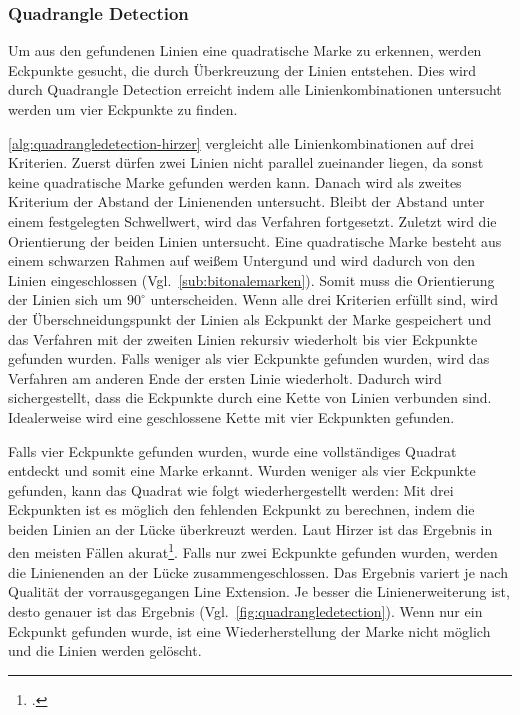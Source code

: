 \subsubsection{Quadrangle Detection} %
\label{sub:quadrangle_detection}

Um aus den gefundenen Linien eine quadratische Marke zu erkennen, werden Eckpunkte gesucht, die durch Überkreuzung der
 Linien entstehen. Dies wird durch Quadrangle Detection erreicht indem alle Linienkombinationen untersucht werden um
 vier Eckpunkte zu finden.



\autoref{alg:quadrangledetection-hirzer} vergleicht alle Linienkombinationen auf drei Kriterien. Zuerst dürfen zwei
 Linien nicht parallel zueinander liegen, da sonst keine quadratische Marke gefunden werden kann. Danach wird als
 zweites Kriterium der Abstand der Linienenden untersucht. Bleibt der Abstand unter einem festgelegten Schwellwert,
 wird das Verfahren fortgesetzt. Zuletzt wird die Orientierung der beiden Linien untersucht. Eine quadratische Marke
 besteht aus einem schwarzen Rahmen auf weißem Untergund und wird dadurch von den Linien eingeschlossen
 (Vgl.~\autoref{sub:bitonalemarken}). Somit muss die Orientierung der Linien sich um $90^\circ$ unterscheiden. Wenn
 alle drei Kriterien erfüllt sind, wird der Überschneidungspunkt der Linien als Eckpunkt der Marke gespeichert und das
 Verfahren mit der zweiten Linien rekursiv wiederholt bis vier Eckpunkte gefunden wurden. Falls weniger als vier
 Eckpunkte gefunden wurden, wird das Verfahren am anderen Ende der ersten Linie wiederholt. Dadurch wird
 sichergestellt, dass die Eckpunkte durch eine Kette von Linien verbunden sind. Idealerweise wird eine geschlossene
 Kette mit vier Eckpunkten gefunden.

Falls vier Eckpunkte gefunden wurden, wurde eine vollständiges Quadrat entdeckt und somit eine Marke erkannt. Wurden
 weniger als vier Eckpunkte gefunden, kann das Quadrat wie folgt wiederhergestellt werden: Mit drei Eckpunkten ist es
 möglich den fehlenden Eckpunkt zu berechnen, indem die beiden Linien an der Lücke überkreuzt werden. Laut Hirzer ist
 das Ergebnis in den meisten Fällen akurat\footcite[Vgl.][S.15]{hirzer08}. Falls nur zwei Eckpunkte gefunden wurden,
 werden die Linienenden an der Lücke zusammengeschlossen. Das Ergebnis variert je nach Qualität der vorrausgegangen
 Line Extension. Je besser die Linienerweiterung ist, desto genauer ist das Ergebnis
 (Vgl.~\autoref{fig:quadrangledetection}). Wenn nur ein Eckpunkt gefunden wurde, ist eine Wiederherstellung der Marke
 nicht möglich und die Linien werden gelöscht.

